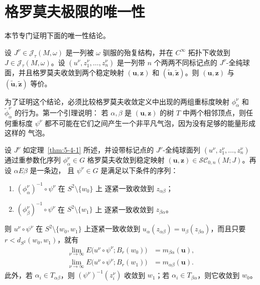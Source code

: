 
\section{格罗莫夫极限的唯一性}\label{sec:5-4}

本节专门证明下面的唯一性结论。

\begin{theorem}\label{thm:5-4-1}
设 $J^\nu\in\mathcal J_\tau(M,\omega)$ 是一列被 $\omega$ 驯服的殆复结构，并在
$C^\infty$ 拓扑下收敛到 $J\in\mathcal J_\tau(M,\omega)$。设
$(u^\nu,z_1^\nu,\ldots,z_n^\nu)$ 是一列带 $n$ 个两两不同标记点的
$J^\nu$-全纯球面，并且格罗莫夫收敛到两个稳定映射
$(\mathbf u,\mathbf z)$ 和 $(\widetilde{\mathbf u},\widetilde{\mathbf z})$。则
$(\mathbf u,\mathbf z)$ 与 $(\widetilde{\mathbf u},\widetilde{\mathbf z})$ 等价。
\end{theorem}

为了证明这个结论，必须比较格罗莫夫收敛定义中出现的两组重标度映射
$\phi_\alpha^\nu$ 和 $\widetilde\phi_{\widetilde\alpha}^\nu$ 的行为。第一个引理说明：
若 $\alpha,\beta$ 是 $(\mathbf u,\mathbf z)$ 的树 $T$ 中两个相邻顶点，则任何重标度
$\psi^\nu$ 都不可能在它们之间产生一个非平凡气泡，因为没有足够的能量形成这样的
气泡。

\begin{lemma}\label{lem:5-4-2}
设 $J^\nu$ 如定理~\ref{thm:5-4-1} 所述，并设带标记点的 $J^\nu$-全纯球面列
$(u^\nu,z_1^\nu,\ldots,z_n^\nu)$ 通过重参数化序列 $\phi_\alpha^\nu\in G$
格罗莫夫收敛到稳定映射
$(\mathbf u,\mathbf z)\in\mathcal{SC}_{0,n}(M;J)$。再设 $\alpha E\beta$ 是一条边，
且 $\psi^\nu\in G$ 是满足以下条件的序列：
\begin{enumerate}[label=(\alph*),leftmargin=3em]
\item $(\phi_\alpha^\nu)^{-1}\circ\psi^\nu$ 在 $S^2\setminus\{w_0\}$ 上
逐紧一致收敛到 $z_{\alpha\beta}$；
\item $(\phi_\beta^\nu)^{-1}\circ\psi^\nu$ 在 $S^2\setminus\{w_1\}$ 上
逐紧一致收敛到 $z_{\beta\alpha}$。
\end{enumerate}
则 $u^\nu\circ\psi^\nu$ 在 $S^2\setminus\{w_0,w_1\}$ 上逐紧一致收敛到
$u_\alpha(z_{\alpha\beta})=u_\beta(z_{\beta\alpha})$，而且只要
$r<d_{S^2}(w_0,w_1)$，就有
\begin{equation}\label{eq:5-4-1}
  \begin{aligned}
  \lim_{\nu\to\infty}E\bigl(u^\nu\circ\psi^\nu;B_r(w_0)\bigr)
  &=m_{\beta\alpha}(\mathbf u),\\
  \lim_{\nu\to\infty}E\bigl(u^\nu\circ\psi^\nu;B_r(w_1)\bigr)
  &=m_{\alpha\beta}(\mathbf u).
  \end{aligned}
\end{equation}
此外，若 $\alpha_i\in T_{\alpha\beta}$，则
$(\psi^\nu)^{-1}(z_i^\nu)$ 收敛到 $w_1$；若
$\alpha_i\in T_{\beta\alpha}$，则它收敛到 $w_0$。
\end{lemma}

